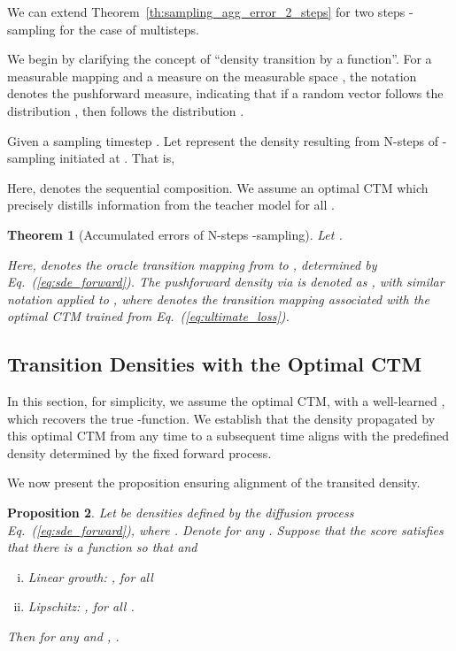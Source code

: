 \documentclass{article} \usepackage{iclr2024_coNFErence,times}
\def\eqref#1{equation~\ref{#1}}
\def\eqref#1{(\ref{#1})}
\def\eqref#1{(\ref{#1})}
\newtheorem{theorem}{Theorem}\newtheorem{proposition}[theorem]{Proposition}
\theoremstyle{definition}
\theoremstyle{remark}
\begin{document}
We can extend Theorem~\ref{th:sampling_agg_error_2_steps} for two steps -sampling for the case of multisteps. 


We begin by clarifying the concept of ``density transition by a function''. For a measurable mapping  and a measure  on the measurable space , the notation  denotes the pushforward measure, indicating that if a random vector  follows the distribution , then  follows the distribution .


Given a sampling timestep  . Let  represent the density resulting from N-steps of -sampling initiated at . That is, 

Here,  denotes the sequential composition. We assume an optimal CTM which precisely distills information from the teacher model  for all .



\begin{theorem}[Accumulated errors of N-steps -sampling]\label{th:sampling_agg_error_N_steps}
Let .

Here,  denotes the oracle transition mapping from  to , determined by Eq.~\eqref{eq:sde_forward}. The pushforward density via  is denoted as , with similar notation applied to , where  denotes the transition mapping associated with the optimal CTM trained from Eq.~\eqref{eq:ultimate_loss}.

    
\end{theorem}










\subsection{Transition Densities with the Optimal CTM}
In this section, for simplicity, we assume the optimal CTM,  with a well-learned , which recovers the true -function. We establish that the density propagated by this optimal CTM from any time  to a subsequent time  aligns with the predefined density determined by the fixed forward process. 



We now present the proposition ensuring alignment of the transited density.
\begin{proposition}\label{th:transition}
    Let  be densities defined by the diffusion process Eq.~\eqref{eq:sde_forward}, where . Denote  for any .  Suppose that the score  satisfies that there is a function  so that  and 
    \begin{enumerate}[(i)]
        \item Linear growth: , for all 
        \item Lipschitz: , for all .
    \end{enumerate}
    Then for any  and , .
\end{proposition}
\end{document}
